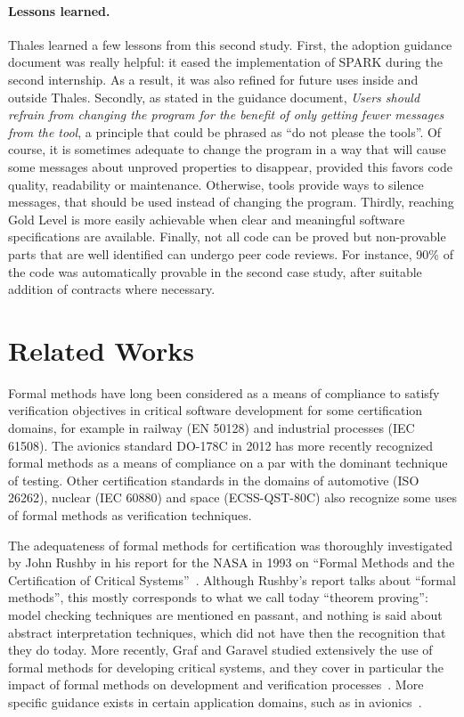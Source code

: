 \documentclass{eceasst}
\begin{document}
\paragraph{Lessons learned.}
Thales learned a few lessons from this second study. First, the adoption
guidance document was really helpful: it eased the implementation of SPARK
during the second internship. As a result, it was also refined for future uses
inside and outside Thales. Secondly, as stated in the guidance document,
\textit{Users should refrain from changing the program for the benefit of only
  getting fewer messages from the tool}, a principle that could be phrased as
``do not please the tools''. Of course, it is sometimes adequate to change the
program in a way that will cause some messages about unproved properties to
disappear, provided this favors code quality, readability or
maintenance. Otherwise, tools provide ways to silence messages, that should be
used instead of changing the program.  Thirdly, reaching Gold Level is more
easily achievable when clear and meaningful software specifications are
available. Finally, not all code can be proved but non-provable parts that are
well identified can undergo peer code reviews. For instance, 90\% of the code
was automatically provable in the second case study, after suitable addition of
contracts where necessary.

\section{Related Works}
\label{sec:related-works}

Formal methods have long been considered as a means of compliance to satisfy
verification objectives in critical software development for some certification
domains, for example in railway (EN 50128) and industrial processes (IEC
61508). The avionics standard DO-178C in 2012 has more recently recognized
formal methods as a means of compliance on a par with the dominant technique of
testing. Other certification standards in the domains of automotive (ISO
26262), nuclear (IEC 60880) and space (ECSS-QST-80C) also recognize some uses
of formal methods as verification techniques.

The adequateness of formal methods for certification was thoroughly
investigated by John Rushby in his report for the NASA in 1993 on ``Formal
Methods and the Certification of Critical
Systems''~\cite{Rushby93formalmethods}. Although Rushby's report talks about
``formal methods'', this mostly corresponds to what we call today ``theorem
proving'': model checking techniques are mentioned en passant, and nothing is
said about abstract interpretation techniques, which did not have then the
recognition that they do today. More recently, Graf and Garavel studied
extensively the use of formal methods for developing critical systems, and they
cover in particular the impact of formal methods on development and
verification processes~\cite{GrafGaravel-BSI-2013}. More specific guidance
exists in certain application domains, such as in
avionics~\cite{BrownERTS2010}.
\end{document}
